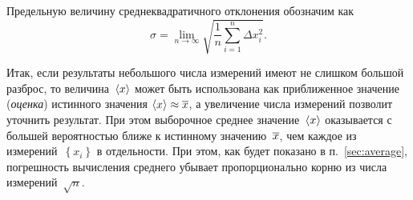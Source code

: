Предельную величину среднеквадратичного отклонения обозначим как
\[
    \sigma = \lim\limits_{n\to\infty} \sqrt{\frac{1}{n} \sum\limits_{i=1}^{n} \Delta x_{i}^{2}}.
\]


Итак, если результаты небольшого числа
измерений имеют не слишком большой разброс, то величина~$\left<x\right>$
может быть использована как приближенное значение (\emph{оценка}) истинного значения
$\left<x\right> \approx \overline{x}$,
а увеличение числа измерений позволит уточнить результат. 
При этом выборочное среднее значение~$\left<x\right>$ оказывается с большей
вероятностью ближе к истинному значению~$\overline{x}$, чем каждое из 
измерений~$\left\{x_i\right\}$ в отдельности. При этом, как будет показано в
п.~\ref{sec:average}, погрешность вычисления среднего убывает пропорционально корню 
из числа измерений~$\sqrt{n}$.



%

